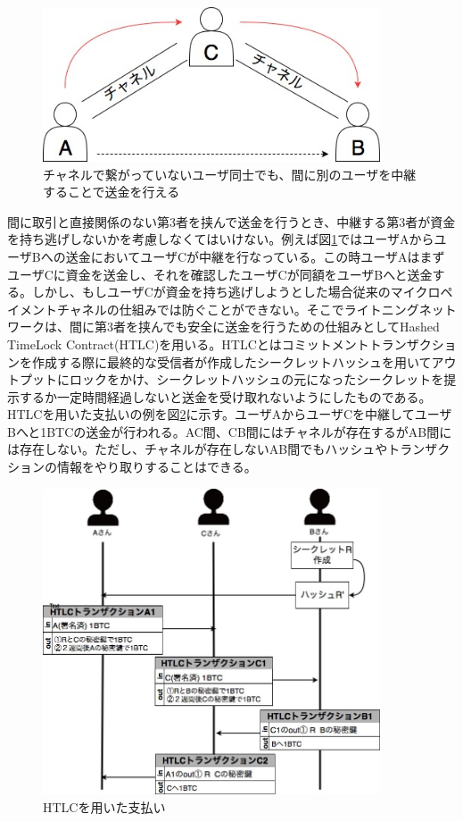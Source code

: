 \documentclass[12pt]{jarticle}
\begin{document}
\begin{figure}[h]
 \centering
   \includegraphics[width=100mm]{figures/multichanel2.jpg}
 \caption{チャネルで繋がっていないユーザ同士でも、間に別のユーザを中継することで送金を行える}
 \label{light1}
\end{figure}

間に取引と直接関係のない第3者を挟んで送金を行うとき、中継する第3者が資金を持ち逃げしないかを考慮しなくてはいけない。例えば図\ref{light1}ではユーザAからユーザBへの送金においてユーザCが中継を行なっている。この時ユーザAはまずユーザCに資金を送金し、それを確認したユーザCが同額をユーザBへと送金する。しかし、もしユーザCが資金を持ち逃げしようとした場合従来のマイクロペイメントチャネルの仕組みでは防ぐことができない。そこでライトニングネットワークは、間に第3者を挟んでも安全に送金を行うための仕組みとしてHashed TimeLock Contract(HTLC)を用いる。HTLCとはコミットメントトランザクションを作成する際に最終的な受信者が作成したシークレットハッシュを用いてアウトプットにロックをかけ、シークレットハッシュの元になったシークレットを提示するか一定時間経過しないと送金を受け取れないようにしたものである。HTLCを用いた支払いの例を図\ref{htlc}に示す。ユーザAからユーザCを中継してユーザBへと1BTCの送金が行われる。AC間、CB間にはチャネルが存在するがAB間には存在しない。ただし、チャネルが存在しないAB間でもハッシュやトランザクションの情報をやり取りすることはできる。

\begin{figure}[h]
 \centering
   \includegraphics[width=100mm]{figures/HTLC.jpg}
 \caption{HTLCを用いた支払い}
 \label{htlc}
\end{figure}
\end{document}

